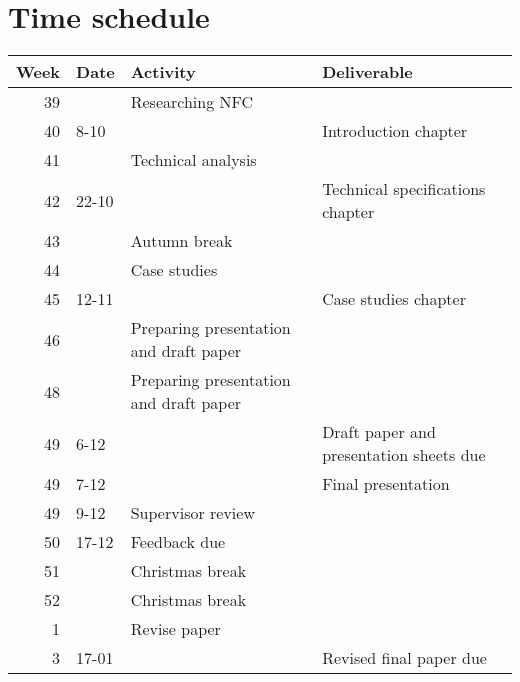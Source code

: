 \documentclass[11pt]{article} %
\begin{document}
\section{Time schedule}
\begin{center}
  \begin{tabular}{ | r | l| l || l | }
    \hline
    Week & Date & Activity & Deliverable \\ \hline
    39 &  & Researching NFC &  \\ \hline
    40 & 8-10 & & Introduction chapter \\ \hline
    41 &  & Technical analysis & \\ \hline
    42 &22-10 & & Technical specifications chapter \\ \hline
    43 & & Autumn break & \\ \hline
    44 & & Case studies & \\ \hline
    45 & 12-11& & Case studies chapter\\ \hline
    46 & & Preparing presentation and draft paper & \\ \hline
    48 & & Preparing presentation and draft paper & \\ \hline
    49 & 6-12 & & Draft paper and presentation sheets due \\ \hline
    49 & 7-12 & & Final presentation  \\ \hline
    49 & 9-12 & Supervisor review & \\ \hline
    50 & 17-12 & Feedback due & \\ \hline
    51 & & Christmas break & \\ \hline
    52 & & Christmas break & \\ \hline
    1 & & Revise paper & \\ \hline
    3 & 17-01 & & Revised final paper due \\ \hline
  \end{tabular}
\end{center}


\end{document}
